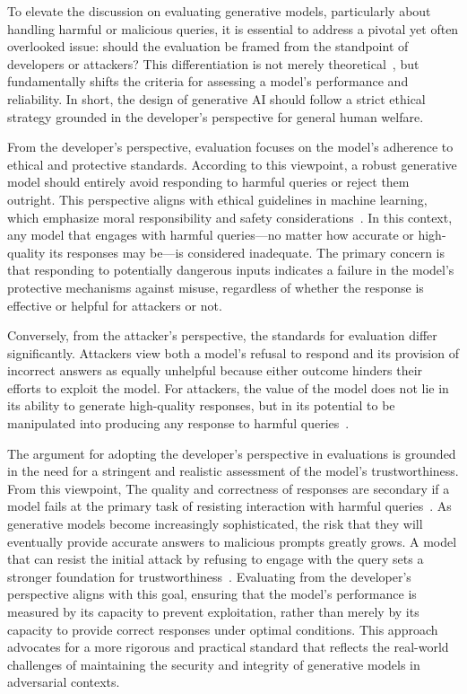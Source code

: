\label{discussion_atkordev}


To elevate the discussion on evaluating generative models, particularly about handling harmful or malicious queries, it is essential to address a pivotal yet often overlooked issue: should the evaluation be framed from the standpoint of developers or attackers? This differentiation is not merely theoretical~\cite{Jia2018AttriGuardAP, Huang2013BadDI, randomtrees2023ethical}, but fundamentally shifts the criteria for assessing a model's performance and reliability. In short, the design of generative AI should follow a strict ethical strategy grounded in the developer's perspective for general human welfare.

From the developer's perspective, evaluation focuses on the model's adherence to ethical and protective standards. According to this viewpoint, a robust generative model should entirely avoid responding to harmful queries or reject them outright. This perspective aligns with ethical guidelines in machine learning, which emphasize moral responsibility and safety considerations~\cite{Du2023UserCentricIA, Wang2023NS4ARAN, Sheetal2021AML, Drum2023UsingNL}. In this context, any model that engages with harmful queries—no matter how accurate or high-quality its responses may be—is considered inadequate. The primary concern is that responding to potentially dangerous inputs indicates a failure in the model's protective mechanisms against misuse, regardless of whether the response is effective or helpful for attackers or not.

Conversely, from the attacker’s perspective, the standards for evaluation differ significantly. Attackers view both a model's refusal to respond and its provision of incorrect answers as equally unhelpful because either outcome hinders their efforts to exploit the model. For attackers, the value of the model does not lie in its ability to generate high-quality responses, but in its potential to be manipulated into producing any response to harmful queries~\cite{Watanabe2018UserBC}.

The argument for adopting the developer’s perspective in evaluations is grounded in the need for a stringent and realistic assessment of the model’s trustworthiness. From this viewpoint, The quality and correctness of responses are secondary if a model fails at the primary task of resisting interaction with harmful queries~\cite{bai2022training, bauer2021generative}. As generative models become increasingly sophisticated, the risk that they will eventually provide accurate answers to malicious prompts greatly grows. A model that can resist the initial attack by refusing to engage with the query sets a stronger foundation for trustworthiness~\cite{saha2024llm, kumar2023certifying}. Evaluating from the developer’s perspective aligns with this goal, ensuring that the model’s performance is measured by its capacity to prevent exploitation, rather than merely by its capacity to provide correct responses under optimal conditions. This approach advocates for a more rigorous and practical standard that reflects the real-world challenges of maintaining the security and integrity of generative models in adversarial contexts.


